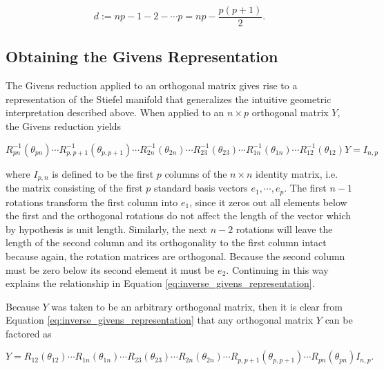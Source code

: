 \documentclass[ba]{imsart}
\numberwithin{equation}{section}
\theoremstyle{plain}
\begin{document}
\begin{equation}
\label{eq:stiefel_dimension}
d := np - 1 - 2- \cdots p  = np - \frac{p(p+1)}{2}.
\end{equation}

\subsection{Obtaining the Givens Representation}\label{givens_representation_introduction}
The Givens reduction applied to an orthogonal matrix gives rise to a representation of the Stiefel manifold that generalizes the intuitive geometric interpretation described above. When applied to an $n \times p$ orthogonal matrix $Y$, the Givens reduction yields 

\begin{equation}
\label{eq:inverse_givens_representation}
R_{pn}^{-1}(\theta_{pn}) \cdots R_{p,p+1}^{-1}(\theta_{p,p+1})  \cdots R_{2n}^{-1}(\theta_{2n}) \cdots R_{23}^{-1}(\theta_{23}) \cdots R_{1n}^{-1}(\theta_{1n}) \cdots R_{12}^{-1}(\theta_{12}) Y = I_{n,p}
\end{equation}

\noindent where $I_{p,n}$ is defined to be the first $p$ columns of the $n \times n$ identity matrix, i.e. the matrix consisting of the first $p$ standard basis vectors $e_1, \cdots, e_p$. The first $n-1$ rotations transform the first column into $e_1$, since it zeros out all elements below the first and the orthogonal rotations do not affect the length of the vector which by hypothesis is unit length. Similarly, the next $n-2$ rotations will leave the length of the second column and its orthogonality to the first column intact because again, the rotation matrices are orthogonal. Because the second column must be zero below its second element it must be $e_2$. Continuing in this way explains the relationship in Equation \ref{eq:inverse_givens_representation}.

\noindent Because $Y$ was taken to be an arbitrary orthogonal matrix, then it is clear from Equation \ref{eq:inverse_givens_representation} that any orthogonal matrix $Y$ can be factored as

\begin{equation}
\label{eq:givens_representation}
Y = R_{12}(\theta_{12}) \cdots R_{1n}(\theta_{1n})  \cdots R_{23}(\theta_{23}) \cdots R_{2n}(\theta_{2n}) \cdots R_{p,p+1}(\theta_{p,p+1}) \cdots R_{pn}(\theta_{pn}) I_{n,p}.
\end{equation}
\end{document}
